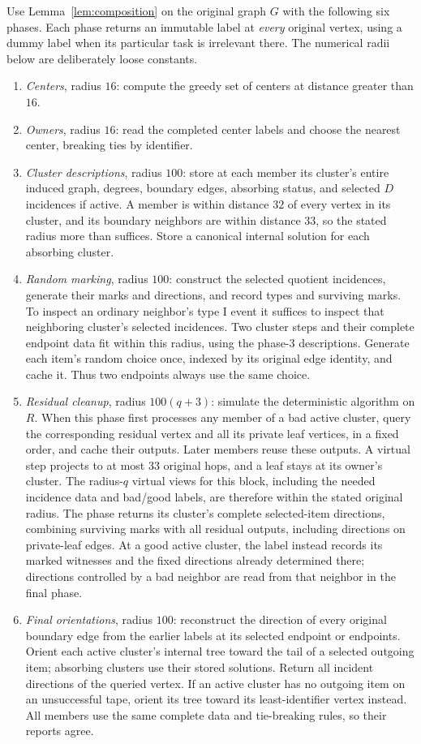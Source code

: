 \documentclass[11pt]{article}
\theoremstyle{definition}
\begin{document}
Use Lemma~\ref{lem:composition} on the original graph $G$ with the following
six phases. Each phase returns an immutable label at \emph{every} original
vertex, using a dummy label when its particular task is irrelevant there.
The numerical radii below are deliberately loose constants.
\begin{enumerate}
\item \emph{Centers}, radius $16$: compute the greedy set of centers at
distance greater than $16$.
\item \emph{Owners}, radius $16$: read the completed center labels and
choose the nearest center, breaking ties by identifier.
\item \emph{Cluster descriptions}, radius $100$: store at each member its
cluster's entire induced graph, degrees, boundary edges, absorbing status,
and selected $D$ incidences if active. A member is within distance $32$
of every vertex in its cluster, and its boundary neighbors are within
distance $33$, so the stated radius more than suffices. Store a canonical
internal solution for each absorbing cluster.
\item \emph{Random marking}, radius $100$: construct the selected quotient
incidences, generate their marks and directions, and record types and
surviving marks. To inspect an ordinary neighbor's type I event it suffices
to inspect that neighboring cluster's selected incidences. Two cluster
steps and their complete endpoint data fit within this radius, using the
phase-3 descriptions. Generate each item's random choice once, indexed by
its original edge identity, and cache it. Thus two endpoints always use
the same choice.
\item \emph{Residual cleanup}, radius $100(q+3)$: simulate the deterministic
algorithm on $R$. When this phase first processes any member of a bad
active cluster, query the corresponding residual vertex and all its
private leaf vertices, in a fixed order, and cache their outputs.
Later members reuse these outputs. A virtual step projects to at most
$33$ original hops, and a leaf stays at its owner's cluster. The
radius-$q$ virtual views for this block, including the needed incidence
data and bad/good labels, are therefore within the stated original
radius. The phase returns its cluster's complete selected-item directions,
combining surviving marks with all residual outputs, including directions
on private-leaf edges. At a good active cluster, the label instead records
its marked witnesses and the fixed directions already determined there;
directions controlled by a bad neighbor are read from that neighbor in
the final phase.
\item \emph{Final orientations}, radius $100$: reconstruct the direction
of every original boundary edge from the earlier labels at its selected
endpoint or endpoints. Orient each active cluster's internal tree toward
the tail of a selected outgoing item; absorbing clusters use their stored
solutions. Return all incident directions of the queried vertex. If an
active cluster has no outgoing item on an unsuccessful tape, orient its
tree toward its least-identifier vertex instead. All members use the same
complete data and tie-breaking rules, so their reports agree.
\end{enumerate}
\end{document}
